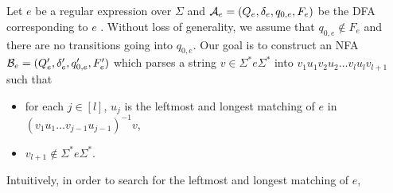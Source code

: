 Let $e$ be a regular expression over $\Sigma$ and $\mathcal{A}_e = (Q_e, \delta_e, q_{0,e}, F_e)$ be the DFA corresponding to $e$ . Without loss of generality, we assume that $q_{0, e} \not \in F_e$ and there are no transitions going into $q_{0,e}$.
Our goal is to construct an NFA $\mathcal{B}_e=(Q'_e, \delta'_e, q'_{0,e}, F'_e)$ which parses a string $v \in \Sigma^\ast e \Sigma^\ast$ into $v_1 u_1 v_2 u_2 \dots v_l u_l v_{l+1}$ such that 
\begin{itemize}
	\item for each $j \in [l]$, $u_j$ is the leftmost and longest matching of $e$ in $(v_1 u_1 \dots v_{j-1} u_{j-1})^{-1} v$,
	\item $v_{l+1} \not \in \Sigma^\ast e \Sigma^\ast$.
\end{itemize}
%
Intuitively, in order to search for the leftmost and longest matching of $e$, 

